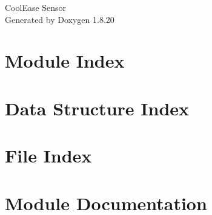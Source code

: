 \let\mypdfximage\pdfximage\def\pdfximage{\immediate\mypdfximage}\documentclass[twoside]{book}
\newcommand{\+}{\discretionary{\mbox{\scriptsize$\hookleftarrow$}}{}{}}
\newcommand{\clearemptydoublepage}{%
  \newpage{\pagestyle{empty}\cleardoublepage}%
}
\begin{document}
\hypersetup{pageanchor=false,
             bookmarksnumbered=true,
             pdfencoding=unicode
            }
\begin{titlepage}
\vspace*{7cm}
\begin{center}%
{\Large Cool\+Ease Sensor }\\
\vspace*{1cm}
{\large Generated by Doxygen 1.8.20}\\
\end{center}
\end{titlepage}
\clearemptydoublepage
{}
\tableofcontents
\clearemptydoublepage
{}
\hypersetup{pageanchor=true}

\chapter{Module Index}

\chapter{Data Structure Index}

\chapter{File Index}

\chapter{Module Documentation}








































\end{document}
